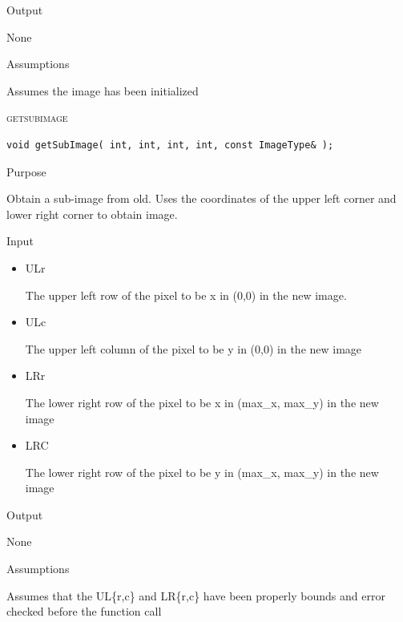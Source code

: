 \documentclass[pdftex, 11pt]{article}
\begin{document}
\begin{description}
\begin{description}
			\item{Output}

				None

			\item{Assumptions}

				Assumes the image has been initialized

		\end{description}


	\item{\textsc{getsubimage}}
		\begin{description}

\begin{lstlisting}
void getSubImage( int, int, int, int, const ImageType& );
\end{lstlisting}

			\item{Purpose}

 				Obtain a sub-image from old.  Uses the coordinates
				of the upper left corner
				and lower right corner to obtain image.

			\item{Input}

				\begin{itemize}

					\item{ULr}
	
						The upper left row of the pixel
						to be x in (0,0) in the new image.

					\item{ULc}

						The upper left column of the pixel
						to be y in (0,0) in the new image

					\item{LRr}

						The lower right row of the pixel
						to be x in (max\_x, max\_y) in the
						new image

					\item{LRC}

						The lower right row of the pixel
						to be y in (max\_x, max\_y) in the
						new image

				\end{itemize}


			\item{Output}

				None


			\item{Assumptions}

				Assumes that the UL\{r,c\} and LR\{r,c\} have been
				properly bounds and error checked before the function
				call


\end{description}
\end{description}
\end{document}
